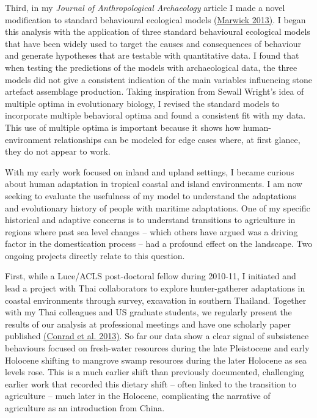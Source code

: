 \documentclass[11pt,article,oneside]{memoir}
\begin{document}
Third, in my \textit{Journal of Anthropological Archaeology} article I made a novel modification to standard behavioural ecological models  {\href{http://faculty.washington.edu/bmarwick/PDFs/Marwick_2013_JAA.pdf}{(Marwick 2013)}}. I began this analysis with the application of three standard behavioural ecological models that have been widely used to target the causes and consequences of behaviour and generate hypotheses that are testable with quantitative data. I found that when testing the predictions of the models with archaeological data, the three models did not give a consistent indication of the main variables influencing stone artefact assemblage production. Taking inspiration from Sewall Wright's idea of multiple optima in evolutionary biology, I revised the standard models to incorporate multiple behavioral optima and found a consistent fit with my data. This use of multiple optima is important because it shows how human-environment relationships can be modeled for edge cases where, at first glance, they do not appear to work.

With my early work focused on inland and upland settings, I became curious about human adaptation in tropical coastal and island environments. I am now seeking to evaluate the usefulness of my model to understand the adaptations and evolutionary history of people with maritime adaptations. One of my specific historical and adaptive concerns is to understand transitions to agriculture in regions where past sea level changes – which others have argued was a driving factor in the domestication process –  had a profound effect on the landscape. Two ongoing projects directly relate to this question.

First, while a Luce/ACLS post-doctoral fellow during 2010-11, I initiated and lead a project with Thai collaborators to explore hunter-gatherer adaptations in coastal environments through survey, excavation in southern Thailand. Together with my Thai colleagues and US graduate students, we regularly present the results of our analysis at professional meetings and have one scholarly paper published {\href{http://faculty.washington.edu/bmarwick/PDFs/Conrad_et_al_2013_TNHMJ.pdf}{(Conrad et al. 2013)}}. So far our data show a clear signal of subsistence behaviours focused on fresh-water resources during the late Pleistocene and early Holocene shifting to mangrove swamp resources during the later Holocene as sea levels rose.  This is a much earlier shift than previously documented, challenging earlier work that recorded this dietary shift – often linked to the transition to agriculture – much later in the Holocene, complicating the narrative of agriculture as an introduction from China. 
\end{document}
